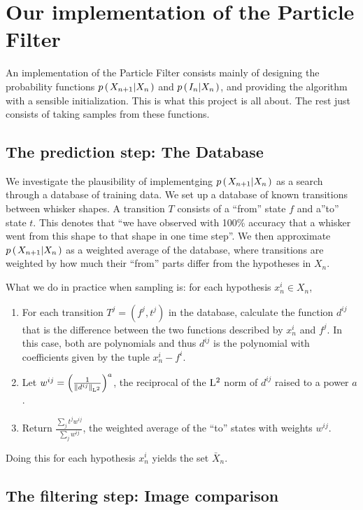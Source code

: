 \section*{Our implementation of the Particle Filter}
An implementation of the Particle Filter consists mainly of designing the probability functions $p\left(\left. X_{n+1} \middle\vert X_n \right.\right)$ and $p\left(\left. I_n \middle\vert X_n \right.\right)$, and providing the algorithm with a sensible initialization. This is what this project is all about. The rest just consists of taking samples from these functions.

\subsection*{The prediction step: The Database}

We investigate the plausibility of implementging $p\left(\left. X_{n+1} \middle\vert X_n \right.\right)$ as a search through a database of training data. We set up a database of known transitions between whisker shapes. A transition $T$ consists of a ``from'' state $f$ and a''to'' state $t$. This denotes that ``we have observed with 100\% accuracy that a whisker went from this shape to that shape in one time step''. We then approximate $p\left(\left. X_{n+1} \middle\vert X_n \right.\right)$ as a weighted average of the database, where transitions are weighted by how much their ``from'' parts differ from the hypotheses in $X_n$.

What we do in practice when sampling is: for each hypothesis $x_n^i \in X_n$,

\begin{enumerate}
  \item For each transition $T^j = (f^j, t^j)$ in the database, calculate the function $d^{ij}$ that is the difference between the two functions described by $x_n^i$ and $f^j$. In this case, both are polynomials and thus $d^{ij}$ is the polynomial with coefficients given by the tuple $x_n^i - f^i$.
  \item Let $w^{ij} = \left(\frac{1}{\left\|d^{ij}\right\|_{\mathrm{L}^2}}\right)^a$, the reciprocal of the $\mathrm{L}^2$ norm of $d^{ij}$ raised to a power $a$.
  \item Return $\frac{\sum_j t^j w^{ij}}{\sum_jw^{ij}}$, the weighted average of the ``to'' states with weights $w^{ij}$.
\end{enumerate}

Doing this for each hypothesis $x_n^i$ yields the set $\bar{X}_n$.

\subsection*{The filtering step: Image comparison}

